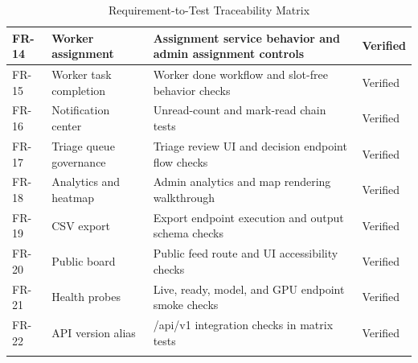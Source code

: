 \begin{xltabular}{\textwidth}{|>{\RaggedRight\arraybackslash}p{0.11\textwidth}|>{\RaggedRight\arraybackslash}p{0.20\textwidth}|>{\RaggedRight\arraybackslash}X|>{\RaggedRight\arraybackslash}p{0.12\textwidth}|}
FR-14 & Worker assignment & Assignment service behavior and admin assignment controls & Verified \\ \hline
FR-15 & Worker task completion & Worker done workflow and slot-free behavior checks & Verified \\ \hline
FR-16 & Notification center & Unread-count and mark-read chain tests & Verified \\ \hline
FR-17 & Triage queue governance & Triage review UI and decision endpoint flow checks & Verified \\ \hline
FR-18 & Analytics and heatmap & Admin analytics and map rendering walkthrough & Verified \\ \hline
FR-19 & CSV export & Export endpoint execution and output schema checks & Verified \\ \hline
FR-20 & Public board & Public feed route and UI accessibility checks & Verified \\ \hline
FR-21 & Health probes & Live, ready, model, and GPU endpoint smoke checks & Verified \\ \hline
FR-22 & API version alias & /api/v1 integration checks in matrix tests & Verified \\ \hline
\caption{Requirement-to-Test Traceability Matrix}
\end{xltabular}
\normalsize
